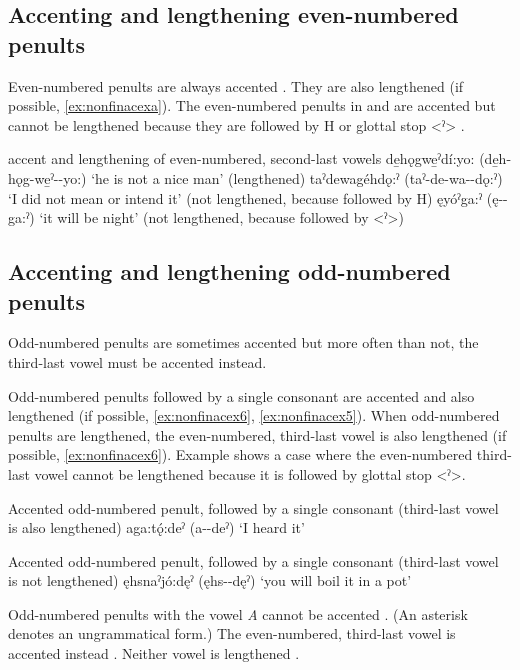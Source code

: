 \subsection{Accenting and lengthening even-numbered penults}
Even-numbered penults are always accented . They are also lengthened (if possible, \ref{ex:nonfinacexa}). The even-numbered penults in  and  are accented but cannot be lengthened because they are followed by H  or glottal stop <ˀ> .

\ea\label{ex:nonfinacex} accent and lengthening of even-numbered, second-last vowels
\ea\label{ex:nonfinacexa} de̱hǫgwe̱ˀdí:yo: (de̱h-hǫg-we̱ˀ--yo:) ‘he is not a nice man’ (lengthened)
\ex\label{ex:nonfinacexb} taˀdewagéhdǫ:ˀ (taˀ-de-wa--dǫ:ˀ) ‘I did not mean or intend it’ (not lengthened, because followed by H)
\ex\label{ex:nonfinacexc} ęyóˀga:ˀ (ę--ga:ˀ) ‘it will be night’ (not lengthened, because followed by <ˀ>)
\z
\z

\subsection{Accenting and lengthening odd-numbered penults}
Odd-numbered penults are sometimes accented but more often than not, the third-last vowel must be accented instead.

Odd-numbered penults followed by a single consonant are accented and also lengthened (if possible, \ref{ex:nonfinacex6}, \ref{ex:nonfinacex5}). When odd-numbered penults are lengthened, the even-numbered, third-last vowel is also lengthened (if possible,  \ref{ex:nonfinacex6}). Example  shows a case where the even-numbered third-last vowel cannot be lengthened because it is followed by glottal stop <ˀ>.

\ea\label{ex:nonfinacex6} Accented odd-numbered penult, followed by a single consonant (third-last vowel is also lengthened)
\ea aga:tǫ́:deˀ (a--deˀ) ‘I heard it’ 
\z
\z 

\ea\label{ex:nonfinacex5} Accented odd-numbered penult, followed by a single consonant (third-last vowel is not lengthened)
\ea ęhsnaˀjó:dęˀ (ęhs--dęˀ) ‘you will boil it in a pot’
\z
\z 


Odd-numbered penults with the vowel \textit{A} cannot be accented . (An asterisk denotes an ungrammatical form.) The even-numbered, third-last vowel is accented instead . Neither vowel is lengthened . 

